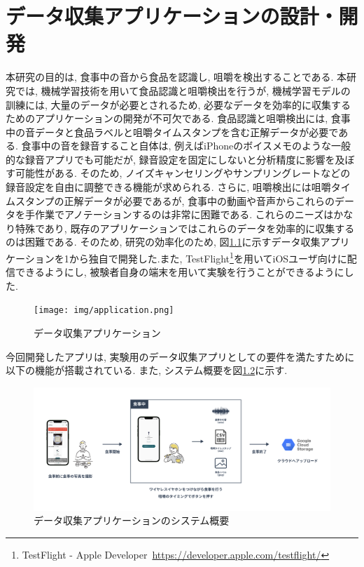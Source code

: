 
\chapter{データ収集アプリケーションの設計・開発}

本研究の目的は, 食事中の音から食品を認識し, 咀嚼を検出することである. 本研究では, 機械学習技術を用いて食品認識と咀嚼検出を行うが, 機械学習モデルの訓練には, 大量のデータが必要とされるため, 必要なデータを効率的に収集するためのアプリケーションの開発が不可欠である. 食品認識と咀嚼検出には, 食事中の音データと食品ラベルと咀嚼タイムスタンプを含む正解データが必要である. 食事中の音を録音すること自体は, 例えばiPhoneのボイスメモのような一般的な録音アプリでも可能だが, 録音設定を固定にしないと分析精度に影響を及ぼす可能性がある. そのため, ノイズキャンセリングやサンプリングレートなどの録音設定を自由に調整できる機能が求められる. さらに, 咀嚼検出には咀嚼タイムスタンプの正解データが必要であるが, 食事中の動画や音声からこれらのデータを手作業でアノテーションするのは非常に困難である. これらのニーズはかなり特殊であり, 既存のアプリケーションではこれらのデータを効率的に収集するのは困難である. そのため, 研究の効率化のため, 図\ref{fig:application}に示すデータ収集アプリケーションを1から独自で開発した.また, TestFlight\footnote{TestFlight - Apple Developer~\url{https://developer.apple.com/testflight/}}を用いてiOSユーザ向けに配信できるようにし, 被験者自身の端末を用いて実験を行うことができるようにした.

\begin{figure}[t]
    \begin{center}
        \texttt{[image: img/application.png]}
        \caption{データ収集アプリケーション}
        \label{fig:application}
    \end{center}
\end{figure}

今回開発したアプリは, 実験用のデータ収集アプリとしての要件を満たすために以下の機能が搭載されている. また, システム概要を図\ref{fig:application-abst}に示す.

\begin{figure}[t]
    \begin{center}
        \includegraphics[clip,  width=0.95\hsize]{img/application-abst.png}
        \caption{データ収集アプリケーションのシステム概要}
        \label{fig:application-abst}
    \end{center}
\end{figure}

